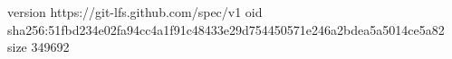 version https://git-lfs.github.com/spec/v1
oid sha256:51fbd234e02fa94cc4a1f91c48433e29d754450571e246a2bdea5a5014ce5a82
size 349692
